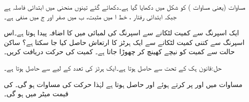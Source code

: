مساوات  (یعنی مساوات ) کو شکل  میں دکھایا گیا ہے۔دکھائے گئے تینوں منحنی میں ابتدائی فاصلہ  ہے جبکہ ابتدائی رفتار ،  خط ا میں مثبت، ب میں صفر اور ج  میں منفی ہے۔

ایک اسپرنگ سے  کمیت لٹکانے سے اسپرنگ کی لمبائی میں  کا اضافہ پیدا ہوتا ہے۔اس اسپرنگ سے کتنی کمیت لٹکانے سے ایک ہرٹز  کا ارتعاش حاصل کیا جا سکتا ہے؟ ساکن حالت سے کمیت کو  نیچے کھینچ کر چھوڑا جاتا ہے۔ کمیت کی حرکت دریافت کریں۔

حل:قانون ہک کے تحت  سے  حاصل ہوتا ہے۔ایک ہرٹز کی تعدد کے لیے  سے  حاصل ہوتا ہے۔

مساوات  میں  اور  پر کرتے ہوئے  اور  حاصل ہوتا ہے لہٰذا حرکت کی مساوات  ہو گی۔ کی قیمت میٹر میں ہو گی۔

